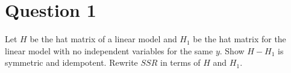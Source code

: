 \section{Question 1}

\begin{question}
    Let $H$ be the hat matrix of a linear model and $H_1$ be the hat matrix for the linear model with no independent variables for the same $y$. Show $H −H_1$ is symmetric and idempotent. Rewrite $SSR$ in terms of $H$ and $H_1$.
\end{question}

\begin{answer}
    
\end{answer}